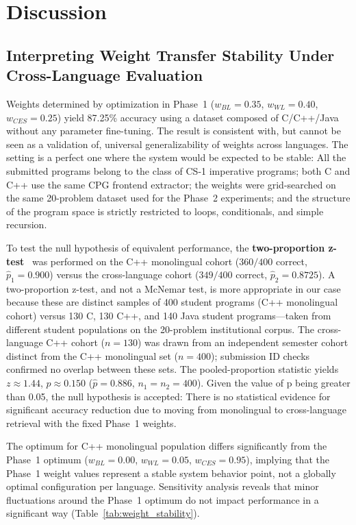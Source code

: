 \section{Discussion}
\label{sec:discussion}

\subsection{Interpreting Weight Transfer Stability Under Cross-Language Evaluation}
\label{subsec:weight_stability_discussion}

Weights determined by optimization in Phase~1 ($w_{BL}=0.35$, $w_{WL}=0.40$, $w_{CES}=0.25$) yield 87.25\% accuracy using a dataset composed of C/C++/Java without any parameter fine-tuning. The result is consistent with, but cannot be seen as a validation of, universal generalizability of weights across languages. The setting is a perfect one where the system would be expected to be stable: All the submitted programs belong to the class of CS-1 imperative programs; both C and C++ use the same CPG frontend extractor; the weights were grid-searched on the same 20-problem dataset used for the Phase~2 experiments; and the structure of the program space is strictly restricted to loops, conditionals, and simple recursion.

To test the null hypothesis of equivalent performance, the \textbf{two-proportion z-test}~\cite{ref_fleiss2003} was performed on the C++ monolingual cohort ($360/400$ correct, $\hat{p}_1 = 0.900$) versus the cross-language cohort ($349/400$ correct, $\hat{p}_2 = 0.8725$). A two-proportion z-test, and not a McNemar test, is more appropriate in our case because these are distinct samples of 400 student programs (C++ monolingual cohort) versus 130 C, 130 C++, and 140 Java student programs---taken from different student populations on the 20-problem institutional corpus. The cross-language C++ cohort ($n=130$) was drawn from an independent semester cohort distinct from the C++ monolingual set ($n=400$); submission ID checks confirmed no overlap between these sets. The pooled-proportion statistic yields $z \approx 1.44$, $p \approx 0.150$ ($\hat{p} = 0.886$, $n_1=n_2=400$). Given the value of p being greater than 0.05, the null hypothesis is accepted: There is no statistical evidence for significant accuracy reduction due to moving from monolingual to cross-language retrieval with the fixed Phase~1 weights.

The optimum for C++ monolingual population differs significantly from the Phase~1 optimum ($w_{BL}=0.00$, $w_{WL}=0.05$, $w_{CES}=0.95$), implying that the Phase~1 weight values represent a stable system behavior point, not a globally optimal configuration per language. Sensitivity analysis reveals that minor fluctuations around the Phase~1 optimum do not impact performance in a significant way (Table~\ref{tab:weight_stability}).


